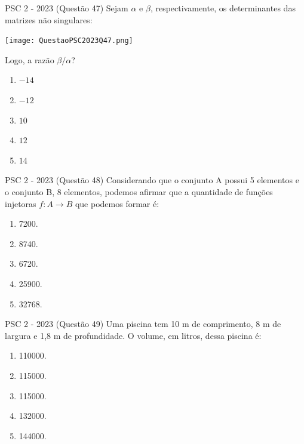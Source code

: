 \documentclass[aspectratio=169]{beamer}
\newif\ifusarcorvermelha
\newcommand{\vermelho}[1]{%
    \ifusarcorvermelha
        {\color{red}#1}%
    \else
        #1%
    \fi
}
\begin{document}
    \begin{frame}{PSC 2 - 2023 (Questão 47)}
      Sejam $\alpha$ e $\beta$, respectivamente, os determinantes das matrizes não singulares:

      \begin{center}
          \texttt{[image: QuestaoPSC2023Q47.png]}
      \end{center} Logo, a razão ${\beta}/{\alpha}$?
      
         \begin{enumerate}[a]
                    \item $-14$
                    \item \vermelho{$-12$} %
                    \item $10$
                    \item $12$
                    \item $14$
                \end{enumerate}        
    \end{frame}

     \begin{frame}{PSC 2 - 2023 (Questão 48)}
        Considerando que o conjunto A possui 5 elementos e o conjunto B, 8 elementos, podemos afirmar que a quantidade de funções injetoras $f:A \to B$ que podemos formar é:

         \begin{enumerate}[a]
                    \item 7200.
                    \item 8740.
                    \item \vermelho{6720.} %
                    \item 25900.
                    \item 32768.
                \end{enumerate}        
    \end{frame}

     \begin{frame}{PSC 2 - 2023 (Questão 49)}
        Uma piscina tem 10 m de comprimento, 8 m de largura e 1,8 m de profundidade. O volume, em litros, dessa piscina é:

         \begin{enumerate}[a]
                    \item 110000.
                    \item 115000.
                    \item 115000.
                    \item 132000.
                    \item \vermelho{144000.} %
                \end{enumerate}        
    \end{frame}
\end{document}
